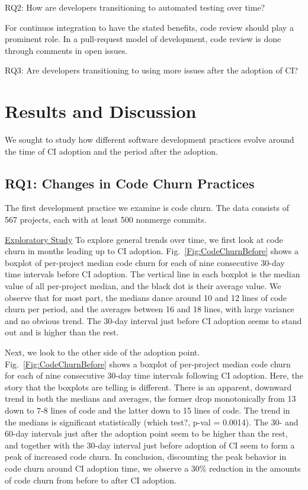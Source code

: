 \documentclass[conference]{IEEEtran}
\begin{document}
RQ2: How are developers transitioning to automated testing over time?

For continuos integration to have the stated benefits, code review should play a prominent role. In a pull-request model of development, code review is done through comments in open issues.

RQ3: Are developers transitioning to using more issues after the adoption of CI?





\section{Results and Discussion}

We sought to study how different software development practices evolve around the time of CI adoption and the period after the adoption.

\subsection{RQ1: Changes in Code Churn Practices}

The first development practice we examine is code churn.
The data consists of 567 projects, each with at least 500 nonmerge commits.

\noindent \underline{Exploratory Study} To explore general trends over time, we first look at code churn in months leading up to CI adoption.
Fig.~\ref{Fig:CodeChurnBefore} shows a boxplot of per-project median code churn for each of nine consecutive 30-day time intervals before CI adoption.
The vertical line in each boxplot is the median value of all per-project median, and the black dot is their average value.
We observe that for most part, the medians dance around 
10 and 12 lines of code churn per period, and the averages between 16 and 18 lines, with large variance and no obvious trend. The 30-day interval just before CI adoption seems to stand out and is higher than the rest.

Next, we look to the other side of the adoption point. Fig.~\ref{Fig:CodeChurnBefore} shows a boxplot of per-project median code churn for each of nine consecutive 30-day time intervals following CI adoption.
Here, the story that the boxplots are telling is different. There is an apparent, downward trend in both the medians and averages, the former drop monotonically from 13 down to 7-8 lines of code and the latter down to 15 lines of code.
The trend in the medians is significant statistically (which test?, p-val = 0.0014).
The 30- and 60-day intervals just after the adoption point seem to be higher than the rest, and together with the 30-day interval just before adoption of CI seem to form a peak of increased code churn.
In conclusion, discounting the peak behavior in code churn around CI adoption time, we observe a 30\% reduction in the amounts of code churn from before to after CI adoption.
\end{document}
